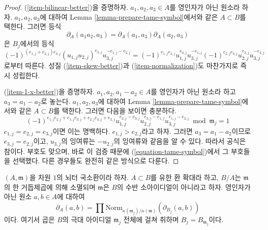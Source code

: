 \begin{proof}
(\ref{item-bilinear-better})을 증명하자.
$a_1, a_2, a_3 \in A$를 영인자가 아닌 원소라 하자.
$a_1, a_2, a_3$에 대하여 Lemma \ref{lemma-prepare-tame-symbol}에서와 같은
$A \subset B$를 택한다. 그러면 등식
$$
\partial_A(a_1a_2, a_3) = \partial_A(a_1, a_3) \partial_A(a_2, a_3)
$$
은 $B_j$에서의 등식
$$
(-1)^{(e_{1, j} + e_{2, j})e_{3, j}}
(u_{1, j}u_{2, j})^{e_{3, j}}u_{3, j}^{-e_{1, j} - e_{2, j}} =
(-1)^{e_{1, j}e_{3, j}}
u_{1, j}^{e_{3, j}}u_{3, j}^{-e_{1, j}}
(-1)^{e_{2, j}e_{3, j}}
u_{2, j}^{e_{3, j}}u_{3, j}^{-e_{2, j}}
$$
로부터 따른다. 성질 (\ref{item-skew-better})과
(\ref{item-normalization})도 마찬가지로 즉시 성립한다.

\medskip\noindent
(\ref{item-1-x-better})을 증명하자. $a_1, a_2, a_1 - a_2 \in A$를
영인자가 아닌 원소라 하고 $a_3 = a_1 - a_2$로 놓는다.
$a_1, a_2, a_3$에 대하여 Lemma \ref{lemma-prepare-tame-symbol}에서와 같은
$A \subset B$를 택한다. 그러면 다음을 보이면 충분하다.
$$
(-1)^{e_{1, j}e_{2, j} + e_{1, j}e_{3, j} + e_{2, j}e_{3, j} + e_{2, j}}
u_{1, j}^{e_{2, j} - e_{3, j}}
u_{2, j}^{e_{3, j} - e_{1, j}}
u_{3, j}^{e_{1, j} - e_{2, j}} \bmod \mathfrak m_j = 1
$$
$e_{1, j} = e_{2, j} = e_{3, j}$이면 이는 명백하다.
$e_{1, j} > e_{2, j}$라고 하자. 그러면 $a_3 = a_1 - a_2$이므로
$e_{3, j} = e_{2, j}$이고, $u_{3, j}$의 잉여류는 $-u_{2, j}$의
잉여류와 같음을 알 수 있다. 따라서 공식은 참이다. 부호도 맞으며,
바로 이 검증 때문에 (\ref{equation-tame-symbol})에서 그 부호들을
선택했다. 다른 경우들도 완전히 같은 방식으로 다룬다.
\end{proof}
\begin{lemma}
\label{lemma-norm-down-tame-symbol}
$(A, \mathfrak m)$을 차원 $1$의 뇌터 국소환이라 하자.
$A \subset B$를 유한 환 확대라 하고, $B/A$는 $\mathfrak m$의 한
거듭제곱에 의해 소멸되며 $\mathfrak m$은 $B$의 수반 소아이디얼이
아니라고 하자. 영인자가 아닌 원소 $a, b \in A$에 대하여
$$
\partial_A(a, b) = \prod
\text{Norm}_{\kappa(\mathfrak m_j)/\kappa(\mathfrak m)}(\partial_{B_j}(a, b))
$$
이다. 여기서 곱은 $B$의 극대 아이디얼 $\mathfrak m_j$ 전체에 걸쳐
취하며 $B_j = B_{\mathfrak m_j}$이다.
\end{lemma}

